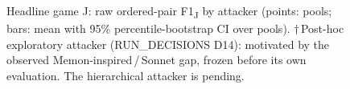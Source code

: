 \begin{figure}[t]\centering

\caption{Headline game J: raw ordered-pair F1\textsubscript{J} by attacker (points: pools; bars: mean with 95\% percentile-bootstrap CI over pools). $\dagger$\,Post-hoc exploratory attacker (RUN\_DECISIONS D14): motivated by the observed Memon-inspired\,/\,Sonnet gap, frozen before its own evaluation. The hierarchical attacker is pending.}
\label{fig:1}
\end{figure}
